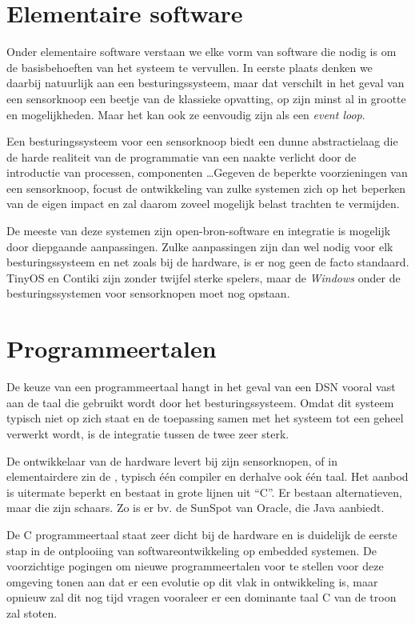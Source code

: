 \section{Elementaire software}
\label{section:solution-software}

Onder elementaire software verstaan we elke vorm van software die nodig is om
de basisbehoeften van het systeem te vervullen. In eerste plaats denken we
daarbij natuurlijk aan een besturingssysteem, maar dat verschilt in het geval
van een sensorknoop een beetje van de klassieke opvatting, op zijn minst al in
grootte en mogelijkheden. Maar het kan ook ze eenvoudig zijn als een
\emph{event loop}.

Een besturingssysteem voor een sensorknoop biedt een dunne abstractielaag die
de harde realiteit van de programmatie van een naakte \mcu verlicht door de
introductie van processen, componenten \dots Gegeven de beperkte voorzieningen
van een sensorknoop, focust de ontwikkeling van zulke systemen zich op het
beperken van de eigen impact en zal daarom zoveel mogelijk belast trachten te
vermijden.

De meeste van deze systemen zijn open-bron-software en integratie is mogelijk
door diepgaande aanpassingen. Zulke aanpassingen zijn dan wel nodig voor elk
besturingssysteem en net zoals bij de hardware, is er nog geen de facto
standaard. TinyOS en Contiki zijn zonder twijfel sterke spelers, maar de
\emph{Windows} onder de besturingssystemen voor sensorknopen moet nog opstaan.

\section{Programmeertalen}
\label{section:solution-proglang}

De keuze van een programmeertaal hangt in het geval van een DSN vooral vast aan
de taal die gebruikt wordt door het besturingssysteem. Omdat dit systeem
typisch niet op zich staat en de toepassing samen met het systeem tot een
geheel verwerkt wordt, is de integratie tussen de twee zeer sterk.

De ontwikkelaar van de hardware levert bij zijn sensorknopen, of in
elementairdere zin de \mcu, typisch \'e\'en compiler en derhalve ook \'e\'en
taal. Het aanbod is uitermate beperkt en bestaat in grote lijnen uit ``C''. Er
bestaan alternatieven, maar die zijn schaars. Zo is er bv. de SunSpot van
Oracle, die Java aanbiedt.

De C programmeertaal staat zeer dicht bij de hardware en is duidelijk de eerste
stap in de ontplooiing van softwareontwikkeling op embedded systemen. De
voorzichtige pogingen om nieuwe programmeertalen voor te stellen voor deze
omgeving tonen aan dat er een evolutie op dit vlak in ontwikkeling is, maar
opnieuw zal dit nog tijd vragen vooraleer er een dominante taal C van de troon
zal stoten.

